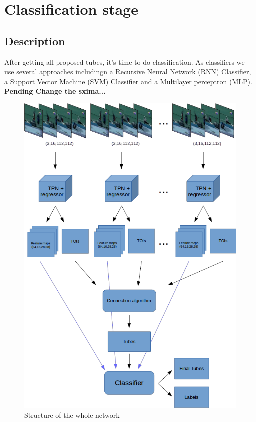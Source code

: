 \documentclass{report}
\begin{document}
\chapter{Classification stage}
\section{Description}
After getting all proposed tubes, it's time to do classification. As classifiers we use several approaches includingn
a Recursive Neural Network (RNN) Classifier, a Support Vector Machine (SVM) Classifier and a Multilayer perceptron (MLP).
\textbf{Pending Change the sxima...}
\\
\begin{figure}[h]
  \centering
  \includegraphics[scale=0.7]{model}
  \caption{Structure of the whole network}
  \label{fig:whole_network}
\end{figure}
\end{document}
